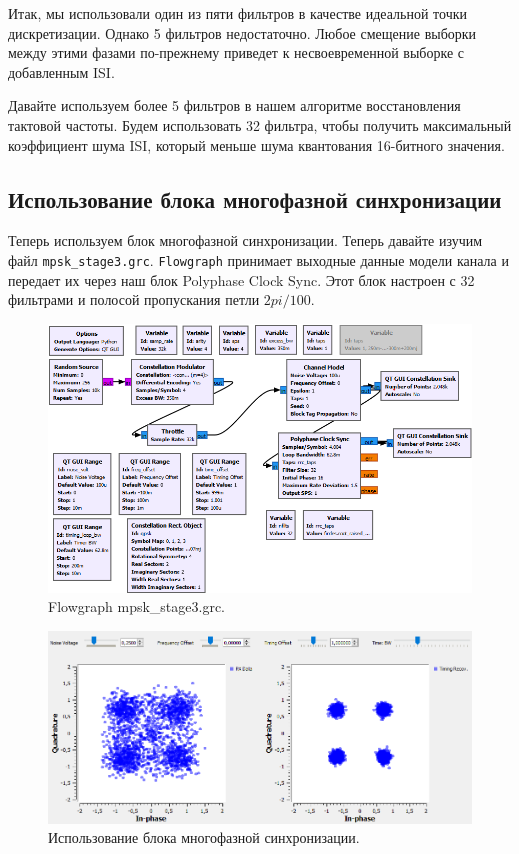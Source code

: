 \documentclass[a4paper, 14pt]{extarticle}
\begin{document}
    Итак, мы использовали один из пяти фильтров в качестве идеальной точки дискретизации.
    Однако 5 фильтров недостаточно.
    Любое смещение выборки между этими фазами по-прежнему приведет к несвоевременной выборке с добавленным ISI.

    Давайте используем более 5 фильтров в нашем алгоритме восстановления тактовой частоты.
    Будем использовать 32 фильтра, чтобы получить максимальный коэффициент шума ISI,
    который меньше шума квантования 16-битного значения.

    \newpage
    \subsection{Использование блока многофазной синхронизации}
    \label{subsec:task3_using_clock_polyphase}

    Теперь используем блок многофазной синхронизации.
    Теперь давайте изучим файл \texttt{mpsk\_stage3.grc}.
    \texttt{Flowgraph} принимает выходные данные модели канала и передает их через наш блок Polyphase Clock Sync.
    Этот блок настроен с 32 фильтрами и полосой пропускания петли $2pi / 100$.

    \begin{figure}[h]
        \centering
        \includegraphics[width=0.8\linewidth]{resources/Images/task3_mpsk_stage3}
        \caption{Flowgraph mpsk\_stage3.grc.}
        \label{fig:task3_mpsk_stage3}
    \end{figure}

    \begin{figure}[h]
        \centering
        \includegraphics[width=0.8\linewidth]{resources/Images/task3_using_polyphase_clock_sync}
        \caption{Использование блока многофазной синхронизации.}
        \label{fig:task3_using_polyphase_clock_sync}
    \end{figure}
\end{document}

